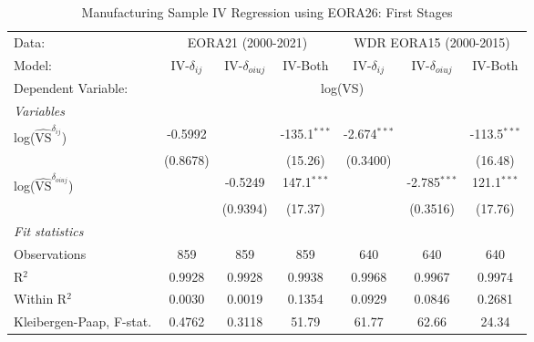 \documentclass[a4paper]{article}
\begin{document}
\begin{table}[h!]
   \caption{\label{tab:MS_RES_F1} Manufacturing Sample IV Regression using EORA26: First Stages}
   \centering
   \begin{tabular}{lcccccc}
       \tabularnewline \toprule
      Data: & \multicolumn{3}{c}{EORA21 (2000-2021)} & \multicolumn{3}{c}{WDR EORA15 (2000-2015)} \\ \cmidrule(lr){2-4} \cmidrule(lr){5-7}
      Model:                   & IV-$\delta_{ij}$      & IV-$\delta_{oiuj}$    & IV-Both              & IV-$\delta_{ij}$      & IV-$\delta_{oiuj}$    & IV-Both\\  
      \midrule
            Dependent Variable: & \multicolumn{6}{c}{log(VS)}\\ \cmidrule(lr){2-7}
      \emph{Variables}\\
      log($\hat{\text{VS}}^{\delta_{ij}}$)       & -0.5992               &                        & -135.1$^{***}$         & -2.674$^{***}$         &                        & -113.5$^{***}$\\   
                                & (0.8678)              &                        & (15.26)                & (0.3400)               &                        & (16.48)\\     
      log($\hat{\text{VS}}^{\delta_{oiuj}}$)             &                       & -0.5249                & 147.1$^{***}$          &                        & -2.785$^{***}$         & 121.1$^{***}$\\    
                                 &                       & (0.9394)               & (17.37)                &                        & (0.3516)               & (17.76)\\
      \emph{Fit statistics}\\
     Observations              & 859                   & 859                    & 859                    & 640                    & 640                    & 640\\  
      R$^2$                     & 0.9928                & 0.9928                 & 0.9938                 & 0.9968                 & 0.9967                 & 0.9974\\  
      Within R$^2$              & 0.0030                & 0.0019                 & 0.1354                 & 0.0929                 & 0.0846                 & 0.2681\\  
      Kleibergen-Paap, F-stat.     & 0.4762                & 0.3118                 & 51.79                  & 61.77                  & 62.66                  & 24.34\\    

\end{tabular}
\end{table}
\end{document}
